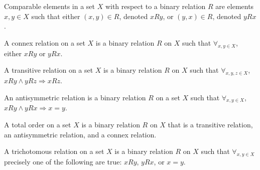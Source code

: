 \documentclass[crop=false,class=book,oneside]{standalone}
\begin{document}
            \begin{definition}
                \label{%
                    Definition:MathEnc:Analysis:%
                    Sum:ComparableElements%
                }
                Comparable elements in a set $X$ with respect
                to a binary relation $R$
                are elements $x,y\in X$ such that either
                $(x,y)\in R$, denoted $xRy$,
                or $(y,x)\in R$, denoted $yRx$.
            \end{definition}
            \begin{definition}
                \label{%
                    Definition:MathEnc:Analysis:%
                    Sum:ConnexRelation%
                }
                A connex relation on a set $X$ is a
                binary relation $R$ on $X$ such that
                $\forall_{x,y\in X}$, either $xRy$ or $yRx$.
            \end{definition}
            \begin{definition}
                \label{%
                    Definition:MathEnc:Analysis:%
                    Sum:TransitiveRelation%
                }
                A transitive relation on a set $X$
                is a binary relation $R$ on $X$ such
                that $\forall_{x,y,z\in X}$,
                $xRy\land yRz\Rightarrow xRz$.
            \end{definition}
            \begin{definition}
                \label{%
                    Definition:MathEnc:Analysis:%
                    Sum:AntisymmetricRelation%
                }
                An antisymmetric relation is a binary relation
                $R$ on a set $X$ such that
                $\forall_{x,y\in X}$, $xRy\land yRx\Rightarrow x=y$.
            \end{definition}
            \begin{definition}
                \label{Definition:MathEnc:Analysis:Sum:TotalOrder}
                A total order on a set $X$ is a binary relation $R$
                on $X$ that is a transitive relation, an
                antisymmetric relation, and a connex relation.
            \end{definition}
            \begin{definition}
                \label{%
                    Definition:MathEnc:Analysis:%
                    Sum:TrichotomousRelation%
                }
                A trichotomous relation on a set $X$ is a
                binary relation $R$ on $X$ such that
                $\forall_{x,y\in X}$ precisely one of the
                following are true: $xRy$, $yRx$, or $x=y$.
            \end{definition}
\end{document}
